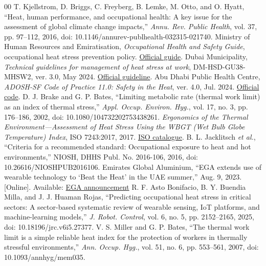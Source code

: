 \documentclass[conference,a4paper]{IEEEtran}
\begin{document}
\begin{thebibliography}{00}
 T. Kjellstrom, D. Briggs, C. Freyberg, B. Lemke, M. Otto, and O. Hyatt, ``Heat, human performance, and occupational health: A key issue for the assessment of global climate change impacts,'' \emph{Annu. Rev. Public Health}, vol. 37, pp. 97--112, 2016, doi: 10.1146/annurev-publhealth-032315-021740.
 Ministry of Human Resources and Emiratisation, \emph{Occupational Health and Safety Guide}, occupational heat stress prevention policy. \href{https://www.mohre.gov.ae/assets/download/6ef28a8/Occupational-Health-and-Safety-Guide-EN.pdf.aspx}{Official guide}.
 Dubai Municipality, \emph{Technical guidelines for management of heat stress at work}, DM-HSD-GU38-MHSW2, ver. 3.0, May 2024. \href{https://www.dm.gov.ae/wp-content/uploads/2024/07/DM-HSD-GU38-MHSW2_Technical-Guidelines-for-Management-of-Heat-Stress-at-Work_V3.pdf}{Official guideline}.
 Abu Dhabi Public Health Centre, \emph{ADOSH-SF Code of Practice 11.0: Safety in the Heat}, ver. 4.0, Jul. 2024. \href{https://www.adphc.gov.ae/-/media/Project/ADPHC/ADPHC/PDF/OSHAD-SF/Codes-of-Practise/11---Safety-in-the-Heat-v31-English.pdf}{Official code}.
 D. J. Brake and G. P. Bates, ``Limiting metabolic rate (thermal work limit) as an index of thermal stress,'' \emph{Appl. Occup. Environ. Hyg.}, vol. 17, no. 3, pp. 176--186, 2002, doi: 10.1080/104732202753438261.
 \emph{Ergonomics of the Thermal Environment---Assessment of Heat Stress Using the WBGT (Wet Bulb Globe Temperature) Index}, ISO 7243:2017, 2017. \href{https://www.iso.org/standard/67188.html}{ISO catalogue}.
 B. L. Jacklitsch \emph{et al.}, ``Criteria for a recommended standard: Occupational exposure to heat and hot environments,'' NIOSH, DHHS Publ. No. 2016-106, 2016, doi: 10.26616/NIOSHPUB2016106.
 Emirates Global Aluminium, ``EGA extends use of wearable technology to `Beat the Heat' in the UAE summer,'' Aug. 9, 2023. [Online]. Available: \href{https://media.ega.ae/ega-extends-use-of-wearable-technology-to-beat-the-heat-in-the-uae-summer/}{EGA announcement}
 R. F. Asto Bonifacio, B. Y. Buendia Milla, and J. J. Huaman Rojas, ``Predicting occupational heat stress in critical sectors: A sector-based systematic review of wearable sensing, IoT platforms, and machine-learning models,'' \emph{J. Robot. Control}, vol. 6, no. 5, pp. 2152--2165, 2025, doi: 10.18196/jrc.v6i5.27377.
 V. S. Miller and G. P. Bates, ``The thermal work limit is a simple reliable heat index for the protection of workers in thermally stressful environments,'' \emph{Ann. Occup. Hyg.}, vol. 51, no. 6, pp. 553--561, 2007, doi: 10.1093/annhyg/mem035.

\end{thebibliography}
\end{document}
